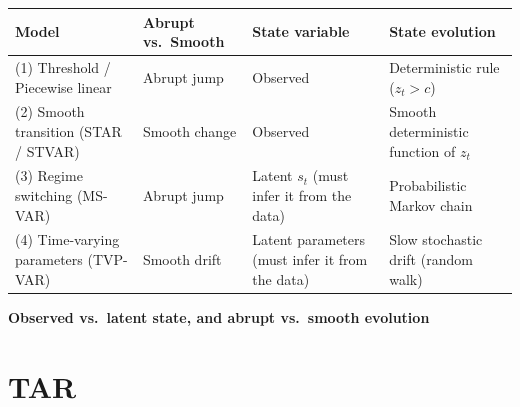 \documentclass{beamer}
\begin{document}
\begin{frame}{}
\footnotesize

\begin{table}[h!]
\centering
\begin{tabular}{p{} p{} p{} p{}}
\toprule
\textbf{Model} &
\textbf{Abrupt vs.\ Smooth} &
\textbf{State variable} &
\textbf{State evolution} \\
\midrule

(1) Threshold / Piecewise linear
& Abrupt jump
& Observed
& Deterministic rule ($z_t > c$) \\[0.4em]

(2) Smooth transition (STAR / STVAR)
& Smooth change
& Observed
& Smooth deterministic function of $z_t$ \\[0.4em]

(3) Regime switching (MS-VAR)
& Abrupt jump
& Latent $s_t$ (must infer it from the data)
& Probabilistic Markov chain \\[0.4em]

(4) Time-varying parameters (TVP-VAR)
& Smooth drift
& Latent parameters (must infer it from the data)
& Slow stochastic drift (random walk) \\
\bottomrule
\end{tabular}
\end{table}

\textbf{Observed vs.\ latent state, and abrupt vs.\ smooth evolution}
\end{frame}



\section{TAR}
\end{document}

